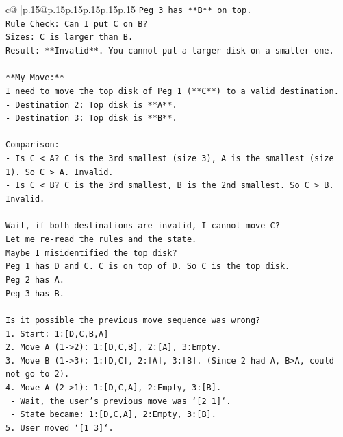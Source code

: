 \documentclass{article}
\begin{document}
{\begin{supertabular}{c@{$\;$}|p{.15\linewidth}@{}p{.15\linewidth}p{.15\linewidth}p{.15\linewidth}p{.15\linewidth}p{.15\linewidth}}
{{{\texttt{Peg 3 has **B** on top.} \\
\texttt{Rule Check: Can I put C on B?} \\
\texttt{Sizes: C is larger than B.} \\
\texttt{Result: **Invalid**. You cannot put a larger disk on a smaller one.} \\
\\ 
\texttt{**My Move:**} \\
\texttt{I need to move the top disk of Peg 1 (**C**) to a valid destination.} \\
\texttt{{-} Destination 2: Top disk is **A**.} \\
\texttt{{-} Destination 3: Top disk is **B**.} \\
\\ 
\texttt{Comparison:} \\
\texttt{{-} Is C < A? C is the 3rd smallest (size 3), A is the smallest (size 1). So C > A. Invalid.} \\
\texttt{{-} Is C < B? C is the 3rd smallest, B is the 2nd smallest. So C > B. Invalid.} \\
\\ 
\texttt{Wait, if both destinations are invalid, I cannot move C?} \\
\texttt{Let me re{-}read the rules and the state.} \\
\texttt{Maybe I misidentified the top disk?} \\
\texttt{Peg 1 has D and C. C is on top of D. So C is the top disk.} \\
\texttt{Peg 2 has A.} \\
\texttt{Peg 3 has B.} \\
\\ 
\texttt{Is it possible the previous move sequence was wrong?} \\
\texttt{1. Start: 1:{[}D,C,B,A{]}} \\
\texttt{2. Move A (1{-}>2): 1:{[}D,C,B{]}, 2:{[}A{]}, 3:Empty.} \\
\texttt{3. Move B (1{-}>3): 1:{[}D,C{]}, 2:{[}A{]}, 3:{[}B{]}. (Since 2 had A, B>A, could not go to 2).} \\
\texttt{4. Move A (2{-}>1): 1:{[}D,C,A{]}, 2:Empty, 3:{[}B{]}.} \\
\texttt{   {-} Wait, the user's previous move was `{[}2 1{]}`.} \\
\texttt{   {-} State became: 1:{[}D,C,A{]}, 2:Empty, 3:{[}B{]}.} \\
\texttt{5. User moved `{[}1 3{]}`.} \\
}}}
\end{supertabular}}
\end{document}
